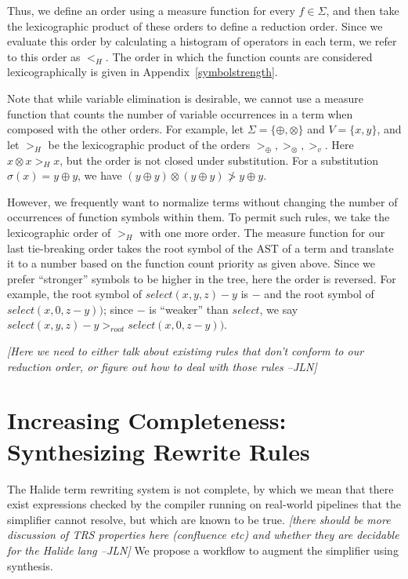 \documentclass[sigplan,review,anonymous]{acmart}\settopmatter{printfolios=true,printccs=false,printacmref=false}
\newcommand{\jln}[1]{\textcolor{uwpurple}{\textit{[{#1} --JLN]}}}
\begin{document}
Thus, we define an order using a measure function for every $f \in \Sigma$, and then take the lexicographic product of these orders to define a reduction order. Since we evaluate this order by calculating a histogram of operators in each term, we refer to this order as $<_H$. The order in which the function counts are considered lexicographically is given in Appendix~\ref{symbolstrength}. 

Note that while variable elimination is desirable, we cannot use a measure function that counts the number of variable occurrences in a term when composed with the other orders. For example, let $\Sigma = \{\oplus, \otimes\}$ and $V = \{x, y\}$, and let $>_H$ be the lexicographic product of the orders $>_{\oplus}, >_{\otimes}, >_v$. Here $x \otimes x >_H x$, but the order is not closed under substitution. For a substitution $\sigma(x) = y \oplus y$, we have $(y \oplus y) \otimes (y \oplus y) \ngtr y \oplus y$. 

However, we frequently want to normalize terms without changing the number of occurrences of function symbols within them. To permit such rules, we take the lexicographic order of $>_H$ with one more order. The measure function for our last tie-breaking order takes the root symbol of the AST of a term and translate it to a number based on the function count priority as given above. Since we prefer ``stronger'' symbols to be higher in the tree, here the order is reversed. For example, the root symbol of $select(x, y, z) - y$ is $-$ and the root symbol of $select(x, 0, z - y))$; since $-$ is ``weaker'' than $select$, we say $select(x, y, z) - y >_{root} select(x, 0, z - y))$.

\jln{Here we need to either talk about existimg rules that don't conform to our reduction order, or figure out how to deal with those rules}



\section{Increasing Completeness: Synthesizing Rewrite Rules}

The Halide term rewriting system is not complete, by which we mean that there exist expressions checked by the compiler running on real-world pipelines that the simplifier cannot resolve, but which are known to be true. \jln{there should be more discussion of TRS properties here (confluence etc) and whether they are decidable for the Halide lang} We propose a workflow to augment the simplifier using synthesis.
\end{document}
